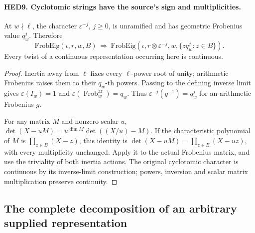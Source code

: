\paragraph{HED9. Cyclotomic strings have the source's sign and multiplicities.}
\label{claim:HED9}
At \(w\nmid\ell\), the character \(\varepsilon^{-j}\),
\(j\geq0\), is unramified and has geometric Frobenius value
\(q_w^j\).  Therefore
\[
 \mathrm{FrobEig}(\iota,r,w,B)
 \ \Longrightarrow\
 \mathrm{FrobEig}(\iota,r\otimes\varepsilon^{-j},w,
                                     \{zq_w^j:z\in B\}).
 \tag{HED.7}
\]
Every twist of a continuous representation occurring here is continuous.
\begin{proof}
Inertia away from \(\ell\) fixes every \(\ell\)-power root of
unity; arithmetic Frobenius raises them to their \(q_w\)-th powers.
Passing to the defining inverse limit gives
\(\varepsilon(I_w)=1\) and
\(\varepsilon(\operatorname{Frob}^{\mathrm{ar}}_w)=q_w\).
Thus \(\varepsilon^{-j}(g^{-1})=q_w^j\) for an arithmetic
Frobenius \(g\).

For any matrix \(M\) and nonzero scalar \(u\),
\(\det(X-uM)=u^{\dim M}\det((X/u)-M)\).  If the characteristic
polynomial of \(M\) is \(\prod_{z\in B}(X-z)\), this identity
is \(\det(X-uM)=\prod_{z\in B}(X-uz)\), with every multiplicity
unchanged.  Apply it to the actual Frobenius matrix, and use the
triviality of both inertia actions.  The original cyclotomic
character is continuous by its inverse-limit construction; powers,
inversion and scalar matrix multiplication preserve continuity.
\end{proof}

\subsection{The complete decomposition of an arbitrary supplied representation}

